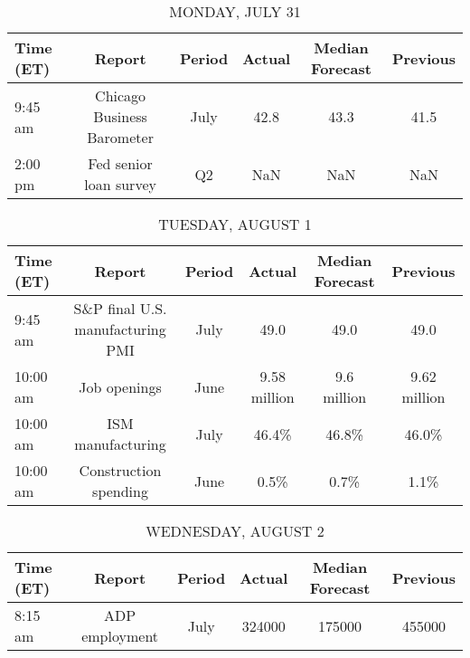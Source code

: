 \documentclass{article}%
\begin{document}
%
\normalsize%


\begin{table}[htbp]%
\caption{MONDAY, JULY 31}%
\centering%
\begin{adjustbox}{width=1\textwidth}%
\begin{tabular}{lccccc}
\toprule
Time (ET) &                     Report & Period & Actual & Median Forecast & Previous \\
\midrule
  9:45 am & Chicago Business Barometer &   July &   42.8 &            43.3 &     41.5 \\
  2:00 pm &     Fed senior loan survey &     Q2 &    NaN &             NaN &      NaN \\
\bottomrule
\end{tabular}
%
\end{adjustbox}%
\end{table}

%


\begin{table}[htbp]%
\caption{TUESDAY, AUGUST 1}%
\centering%
\begin{adjustbox}{width=1\textwidth}%
\begin{tabular}{lccccc}
\toprule
Time (ET) &                           Report & Period &       Actual & Median Forecast &     Previous \\
\midrule
  9:45 am & S\&P final U.S. manufacturing PMI &   July &         49.0 &            49.0 &         49.0 \\
 10:00 am &                     Job openings &   June & 9.58 million &     9.6 million & 9.62 million \\
 10:00 am &                ISM manufacturing &   July &        46.4\% &           46.8\% &        46.0\% \\
 10:00 am &            Construction spending &   June &         0.5\% &            0.7\% &         1.1\% \\
\bottomrule
\end{tabular}
%
\end{adjustbox}%
\end{table}

%


\begin{table}[htbp]%
\caption{WEDNESDAY, AUGUST 2}%
\centering%
\begin{adjustbox}{width=1\textwidth}%
\begin{tabular}{lccccc}
\toprule
Time (ET) &         Report & Period & Actual & Median Forecast & Previous \\
\midrule
  8:15 am & ADP employment &   July & 324000 &          175000 &   455000 \\
\bottomrule
\end{tabular}
%
\end{adjustbox}%
\end{table}
\end{document}
